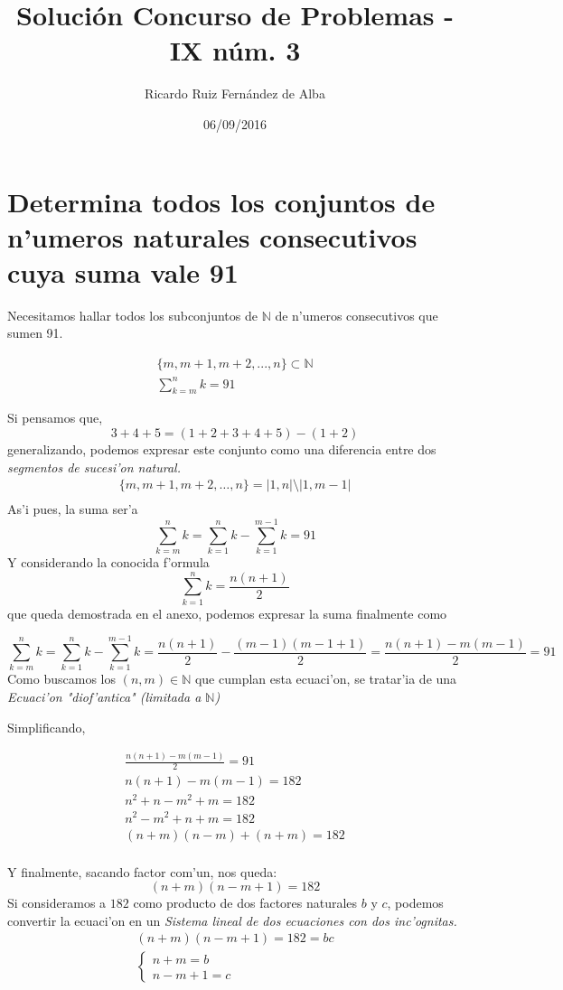 \documentclass[12pt]{article}
\title{\textbf{Soluci\'on Concurso de Problemas - IX n\'um. 3}}
\author{Ricardo Ruiz Fern\'andez de Alba}
\date{06/09/2016}
\begin{document}
\maketitle

\section{Determina todos los conjuntos de n'umeros naturales consecutivos cuya suma vale 91}

Necesitamos hallar todos los subconjuntos de $\mathbb{N}$ de n'umeros consecutivos que sumen 91.

\begin{align*}
	\{m, m+1, m+2, ..., n \} \subset \mathbb{N} \\
	\sum_{k=m}^nk = 91
\end{align*}

Si pensamos que, $$3+4+5= (1+2+3+4+5) - (1+2)$$ generalizando, podemos expresar este conjunto como una diferencia entre dos \emph{segmentos de sucesi'on natural.}
\begin{align*}
\{m, m+1, m+2, \ldots, n\} = |1, n| \setminus |1, m-1|\\
\end{align*}
As'i pues, la suma ser'a
$$
\sum_{k=m}^nk = \sum_{k=1}^nk- \sum_{k=1}^{m-1}k = 91
$$
Y considerando la conocida f'ormula
$$
\sum_{k=1}^nk=\frac{n(n+1)}{2}
$$
que queda demostrada en el anexo, podemos expresar la suma finalmente como

$$
\sum_{k=m}^nk = \sum_{k=1}^nk- \sum_{k=1}^{m-1}k =\frac{n(n+1)}{2} - \frac{(m-1)(m-1+1)}{2} =\frac{n(n+1) - m(m-1)}{2} = 91
$$
Como buscamos los $(n,m)\in\mathbb{N}$ que cumplan esta ecuaci'on, se tratar'ia de una \emph{Ecuaci'on "diof'antica" (limitada a $\mathbb{N}$)}

Simplificando,

\begin{align*}
\frac{n(n+1) - m(m-1)}{2} = 91 \\
n(n+1) - m(m-1) = 182 \\
n^2+n-m^2+m = 182 \\
n^2-m^2+n+m = 182 \\
(n+m)(n-m)+(n+m) = 182 \\
\end{align*}

Y finalmente, sacando factor com'un, nos queda:
$$
(n+m)(n-m+1) = 182
$$
Si consideramos a $182$ como producto de dos factores naturales $b$ y $c$, podemos convertir la ecuaci'on en un \emph{Sistema lineal de dos ecuaciones con dos inc'ognitas.}
\begin{align*}
(n+m)(n-m+1) = 182 = bc \\
\left\{ 
\begin{array}{c}
n + m= b \\ 
n-m +1 = c
\end{array}
\right. 
\end{align*}
 
\end{document}
